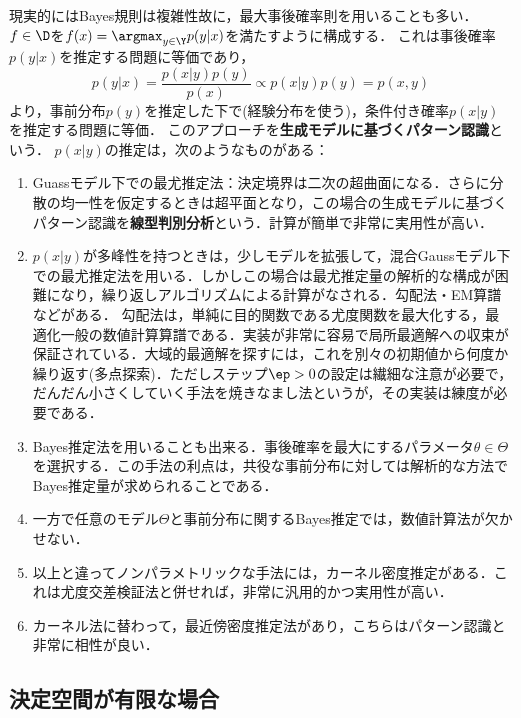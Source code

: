 \documentclass[uplatex,dvipdfmx]{jsreport}
\begin{document}
\begin{example}[最大事後確率則を満たす識別器の構成]
    現実的にはBayes規則は複雑性故に，最大事後確率則を用いることも多い．
    $f\in\D$を$f(x)=\argmax_{y\in\Y}p(y|x)$を満たすように構成する．
    これは事後確率$p(y|x)$を推定する問題に等価であり，
    \[p(y|x)=\frac{p(x|y)p(y)}{p(x)}\propto p(x|y)p(y)=p(x,y)\]
    より，事前分布$p(y)$を推定した下で(経験分布を使う)，条件付き確率$p(x|y)$を推定する問題に等価．
    このアプローチを\textbf{生成モデルに基づくパターン認識}という．
    $p(x|y)$の推定は，次のようなものがある：
    \begin{enumerate}
        \item Guassモデル下での最尤推定法：決定境界は二次の超曲面になる．さらに分散の均一性を仮定するときは超平面となり，この場合の生成モデルに基づくパターン認識を\textbf{線型判別分析}という．計算が簡単で非常に実用性が高い．
        \item $p(x|y)$が多峰性を持つときは，少しモデルを拡張して，混合Gaussモデル下での最尤推定法を用いる．しかしこの場合は最尤推定量の解析的な構成が困難になり，繰り返しアルゴリズムによる計算がなされる．勾配法・EM算譜などがある．
        勾配法は，単純に目的関数である尤度関数を最大化する，最適化一般の数値計算算譜である．実装が非常に容易で局所最適解への収束が保証されている．大域的最適解を探すには，これを別々の初期値から何度か繰り返す(多点探索)．ただしステップ$\ep>0$の設定は繊細な注意が必要で，だんだん小さくしていく手法を焼きなまし法というが，その実装は練度が必要である．
        \item Bayes推定法を用いることも出来る．事後確率を最大にするパラメータ$\theta\in\Theta$を選択する．この手法の利点は，共役な事前分布に対しては解析的な方法でBayes推定量が求められることである．
        \item 一方で任意のモデル$\Theta$と事前分布に関するBayes推定では，数値計算法が欠かせない．
        \item 以上と違ってノンパラメトリックな手法には，カーネル密度推定がある．これは尤度交差検証法と併せれば，非常に汎用的かつ実用性が高い．
        \item カーネル法に替わって，最近傍密度推定法があり，こちらはパターン認識と非常に相性が良い．
    \end{enumerate}
\end{example}

\subsection{決定空間が有限な場合}
\end{document}
